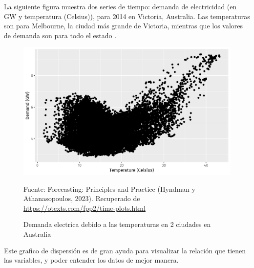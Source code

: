 \begin{itemize}
        La siguiente figura muestra dos series de tiempo: demanda de electricidad (en GW y temperatura (Celsius)), para 2014 en Victoria, Australia. Las temperaturas son para Melbourne, la ciudad más grande de Victoria, mientras que los valores de demanda son para todo el estado \cite{forecast-time-series-arima}.

        \begin{figure}[H]
            \begin{minipage}[t]{0.9\textwidth}
                \caption{Demanda electrica debido a las temperaturas en 2 ciudades en Australia}
                \label{scatteroplot}        
            \end{minipage}
        
            \vspace{10pt}
        
            \begin{minipage}[b]{0.9\textwidth}
                \centering
                \includegraphics[width=\textwidth]{img/Demanda electrica debido a las temperaturas en 2 ciudades en Australia.png}        
            \end{minipage}
        
            \begin{minipage}[t]{0.9\textwidth}
                Fuente: Forecasting: Principles and Practice (Hyndman y Athanasopoulos, 2023). Recuperado de \url{https://otexts.com/fpp2/time-plots.html}
            \end{minipage}
        \end{figure}

        Este grafico de dispersión es de gran ayuda para visualizar la relación que tienen las variables, y poder entender los datos de mejor manera.


\end{itemize}
